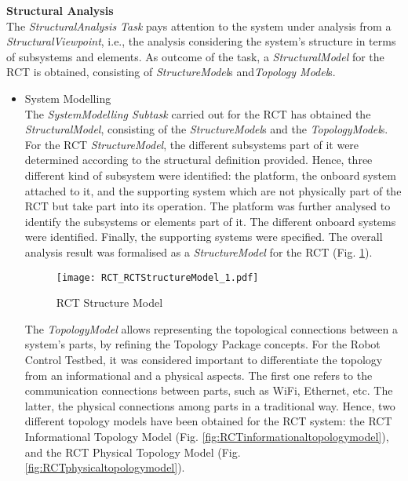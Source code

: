 \begin{description}
\item \textbf{Structural Analysis}\\

The \emph{StructuralAnalysis Task} pays attention to the system under analysis from a \emph{StructuralViewpoint}, i.e., the analysis considering the system's structure in terms of subsystems and elements. As outcome of the task, a \emph{StructuralModel} for the RCT is obtained, consisting of \emph{StructureModel}s and\emph{Topology Model}s.\\

\begin{itemize}
\item System Modelling\\

The \emph{SystemModelling Subtask} carried out for the RCT has obtained the \emph{StructuralModel}, consisting of the \emph{StructureModel}s and the \emph{TopologyModel}s. For the RCT \emph{StructureModel}, the different subsystems part of it were determined according to the structural definition provided. Hence, three different kind of subsystem were identified: the platform, the onboard system attached to it, and the supporting system which are not physically part of the RCT but take part into its operation. The platform was further analysed to identify the subsystems or elements part of it. The different onboard systems were identified. Finally, the supporting systems were specified. The overall analysis result was formalised as a \emph{StructureModel} for the RCT (Fig. \ref{fig:RCTsystemmodel}). \\

\begin{figure}[htbp]
\begin{center}
 {\texttt{[image: RCT\_RCTStructureModel\_1.pdf]}}
\end{center}
\caption{RCT Structure Model}
\label{fig:RCTsystemmodel}
\end{figure}


The \emph{TopologyModel} allows representing the topological connections between a system's parts, by refining the Topology Package concepts. For the Robot Control Testbed, it was considered important to differentiate the topology from an informational and a physical aspects. The first one refers to the communication connections between parts, such as WiFi, Ethernet, etc. The latter, the physical connections among parts in a traditional way. Hence, two different topology models have been obtained for the RCT system: the RCT Informational Topology Model (Fig. \ref{fig:RCTinformationaltopologymodel}), and the RCT Physical Topology Model (Fig. \ref{fig:RCTphysicaltopologymodel}).\\


\end{itemize}
\end{description}
